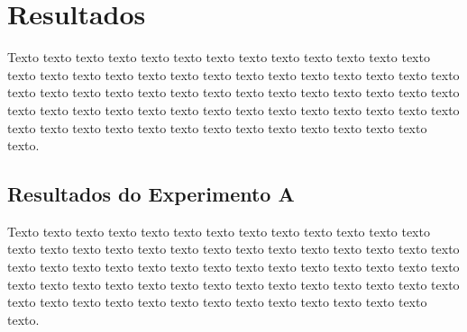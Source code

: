 \chapter{Resultados}
\label{chap:resultados}

Texto texto texto texto texto texto texto texto texto texto texto texto texto texto texto texto texto texto texto texto texto texto texto texto texto texto texto texto texto texto texto texto texto texto texto texto texto texto texto texto texto texto texto texto texto texto texto texto texto texto texto texto texto texto texto texto texto texto texto texto texto texto texto texto texto texto texto texto texto.

\section{Resultados do Experimento A}
\label{sec:resultados-do-experimento-a}


\begin{figure}[h!]
\end{figure}

Texto texto texto texto texto texto texto texto texto texto texto texto texto texto texto texto texto texto texto texto texto texto texto texto texto texto texto texto texto texto texto texto texto texto texto texto texto texto texto texto texto texto texto texto texto texto texto texto texto texto texto texto texto texto texto texto texto texto texto texto texto texto texto texto texto texto texto texto texto.



